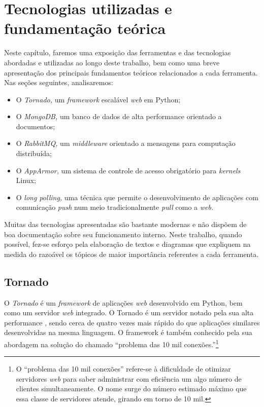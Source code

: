 \documentclass[ruledheader, 12pt]{abnt}
\begin{document}
\chapter{Tecnologias utilizadas e fundamentação teórica}

Neste capítulo, faremos uma exposição das ferramentas e das tecnologias abordadas e utilizadas ao longo deste trabalho, bem como uma breve apresentação dos principais fundamentos teóricos relacionados a cada ferramenta. Nas seções seguintes, analisaremos:
\begin{itemize}
	\item O \emph{Tornado,} um \emph{framework} escalável \emph{web} em Python;
	\item O \emph{MongoDB,} um banco de dados de alta performance orientado a documentos;
	\item O \emph{RabbitMQ,} um \emph{middleware} orientado a mensagens para computação distribuída;
	\item O \emph{AppArmor,} um sistema de controle de acesso obrigatório para \emph{kernels} Linux;
	\item O \emph{long polling,} uma técnica que permite o desenvolvimento de aplicações com comunicação \emph{push} num meio tradicionalmente \emph{pull} como a \emph{web.}
\end{itemize}

Muitas das tecnologias apresentadas são bastante modernas e não dispõem de boa documentação sobre seu funcionamento interno. Neste trabalho, quando possível, fez-se esforço pela elaboração de textos e diagramas que expliquem na medida do razoável os tópicos de maior importância referentes a cada ferramenta.
	
\section{Tornado}

O \emph{Tornado} é um \emph{framework} de aplicações \emph{web} desenvolvido em Python, bem como um servidor \emph{web} integrado. O Tornado é um servidor notado pela sua alta performance \cite{tornado2009}, sendo cerca de quatro vezes mais rápido do que aplicações similares desenvolvidas na mesma linguagem. O framework é também conhecido pela sua abordagem na solução do chamado ``problema das 10 mil conexões.''\footnote{O ``problema das 10 mil conexões'' refere-se à dificuldade de otimizar servidores \emph{web} para saber administrar com eficiência um algo número de clientes simultaneamente. O nome surge do número estimado máximo que essa classe de servidores atende, girando em torno de 10 mil.}
\end{document}
